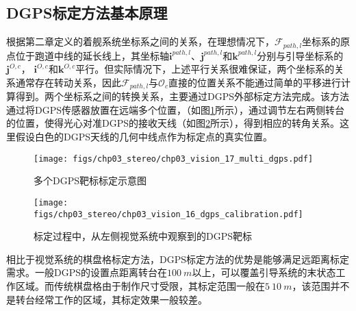 \subsection{DGPS标定方法基本原理}
根据第二章定义的着舰系统坐标系之间的关系，在理想情况下，$\mathcal{F}_{path,l}$坐标系的原点位于跑道中线的延长线上，其坐标轴$\mathbf{i}^{path,l}$、$\mathbf{j}^{path,l}$和$\mathbf{k}^{path,l}$分别与引导坐标系的$\mathbf{j}^{O,c}$， $\mathbf{i}^{O,c}$和$\mathbf{k}^{O,c}$平行。但实际情况下，上述平行关系很难保证，两个坐标系的关系通常存在转动关系，因此$\mathcal{F}_{path,l}$与$\mathcal{O}_c$直接的位置关系不能通过简单的平移进行计算得到。两个坐标系之间的转换关系，主要通过DGPS外部标定方法完成\cite{liao2009automatic}。该方法通过将DGPS传感器放置在远端多个位置，（如图\ref{fig:chp03_vision_17_multi_dgps}所示），通过调节左右两侧转台的位置，使得光心对准DGPS的接收天线（如图\ref{fig:chp03_vision_16_dgps_calibration}所示），得到相应的转角关系。这里假设白色的DGPS天线的几何中线点作为标定点的真实位置。

\begin{figure}[!th]
	\centering
	\texttt{[image: figs/chp03\_stereo/chp03\_vision\_17\_multi\_dgps.pdf]}	
	\caption{多个DGPS靶标标定示意图}
	\label{fig:chp03_vision_17_multi_dgps}
\end{figure}


\begin{figure}[htb]
	\centering
	\texttt{[image: figs/chp03\_stereo/chp03\_vision\_16\_dgps\_calibration.pdf]}	
	\caption{标定过程中，从左侧视觉系统中观察到的DGPS靶标}
	\label{fig:chp03_vision_16_dgps_calibration}
\end{figure}


相比于视觉系统的棋盘格标定方法，DGPS标定方法的优势是能够满足远距离标定需求。一般DGPS的设置点距离转台在$100\ m$以上，可以覆盖引导系统的末状态工作区域。而传统棋盘格由于制作尺寸受限，其标定范围一般在$5~10\ m$，该范围并不是转台经常工作的区域，其标定效果一般较差。

